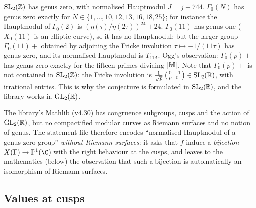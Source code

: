 \begin{example}\label{ch16:ex:genus}
$\mathrm{SL}_2(\mathbb{Z})$ has genus zero, with normalised Hauptmodul $J=j-744$.  $\Gamma_0(N)$ has genus zero exactly for
$N\in\{1,\dots,10,12,13,16,18,25\}$; for instance the Hauptmodul of $\Gamma_0(2)$ is $(\eta(\tau)/\eta(2\tau))^{24}+24$.
$\Gamma_0(11)$ has genus one ($X_0(11)$ is an elliptic curve), so it has no Hauptmodul; but the larger group
$\Gamma_0(11)+$ obtained by adjoining the Fricke involution $\tau\mapsto-1/(11\tau)$ has genus zero, and its normalised
Hauptmodul is $T_{11A}$.  Ogg's observation: $\Gamma_0(p)+$ has genus zero exactly for the fifteen primes dividing
$|\mathbb{M}|$.  Note that $\Gamma_0(p)+$ is not contained in $\mathrm{SL}_2(\mathbb{Z})$: the Fricke involution is
$\frac1{\sqrt p}\left(\begin{smallmatrix}0&-1\\p&0\end{smallmatrix}\right)\in\mathrm{SL}_2(\mathbb{R})$, with irrational entries.  This is why the conjecture is
formulated in $\mathrm{SL}_2(\mathbb{R})$, and the library works in $\mathrm{GL}_2(\mathbb{R})$.
\end{example}

The library's Mathlib (v4.30) has congruence subgroups, cusps and the action of $\mathrm{GL}_2(\mathbb{R})$, but no compactified
modular curves as Riemann surfaces and no notion of genus.  The statement file therefore encodes ``normalised
Hauptmodul of a genus-zero group'' \emph{without Riemann surfaces}: it asks that $f$ induce a \emph{bijection}
$\chsixteenX\to\chsixteenP(\C)$ with the right behaviour at the cusps, and leaves to the mathematics (below) the
observation that such a bijection is automatically an isomorphism of Riemann surfaces.

\subsection{Values at cusps}

